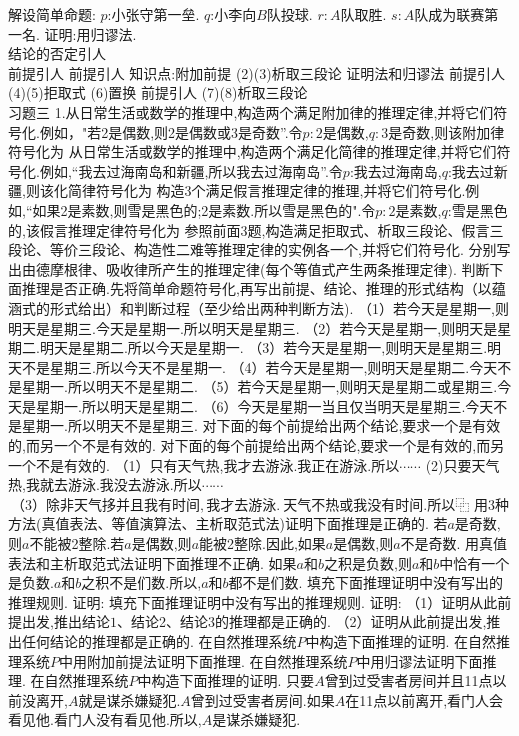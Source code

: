 {解设简单命题:
$p$:小张守第一垒.
$q$:小李向$B$队投球.
$r:A$队取胜.
$s:A$队成为联赛第一名.
证明:用归谬法.\\
结论的否定引人\\
前提引人
前提引人
知识点:附加前提
(2)(3)析取三段论
证明法和归谬法
前提引人
(4)(5)拒取式
(6)置换
前提引人
(7)(8)析取三段论\\
{习题三}
1.从日常生活或数学的推理中,构造两个满足附加律的推理定律,并将它们符号化.例如，"若2是偶数,则2是偶数或3是奇数”.令$p:2$是偶数,$q:3$是奇数,则该附加律符号化为
从日常生活或数学的推理中,构造两个满足化简律的推理定律,并将它们符号化.例如,“我去过海南岛和新疆,所以我去过海南岛”.令$p$:我去过海南岛,$q$:我去过新疆,则该化简律符号化为
构造3个满足假言推理定律的推理,并将它们符号化.例如,“如果2是素数,则雪是黑色的;2是素数.所以雪是黑色的".令$p:2$是素数,$q$:雪是黑色的,该假言推理定律符号化为
参照前面3题,构造满足拒取式、析取三段论、假言三段论、等价三段论、构造性二难等推理定律的实例各一个,并将它们符号化.
分别写出由德摩根律、吸收律所产生的推理定律(每个等值式产生两条推理定律).
判断下面推理是否正确.先将简单命题符号化,再写出前提、结论、推理的形式结构（以蕴涵式的形式给出）和判断过程（至少给出两种判断方法).
（1）若今天是星期一,则明天是星期三.今天是星期一.所以明天是星期三.
（2）若今天是星期一,则明天是星期二.明天是星期二.所以今天是星期一.
（3）若今天是星期一,则明天是星期三.明天不是星期三.所以今天不是星期一.
（4）若今天是星期一,则明天是星期二.今天不是星期一.所以明天不是星期二.
（5）若今天是星期一,则明天是星期二或星期三.今天是星期一.所以明天是星期二.
（6）今天是星期一当且仅当明天是星期三.今天不是星期一.所以明天不是星期三.
对下面的每个前提给出两个结论,要求一个是有效的,而另一个不是有效的.
对下面的每个前提给出两个结论,要求一个是有效的,而另一个不是有效的.
（1）只有天气热,我才去游泳.我正在游泳.所以$\cdots\cdots$
(2)只要天气热,我就去游泳.我没去游泳.所以$\cdots\cdots$
$\mathrm{~（3）除非天气拸并且我有时间,我才去游泳.~天气不热或我没有时间.所以⿻}$
用3种方法(真值表法、等值演算法、主析取范式法)证明下面推理是正确的.
若$a$是奇数,则$a$不能被2整除.若$a$是偶数,则$a$能被2整除.因此,如果$a$是偶数,则$a$不是奇数.
用真值表法和主析取范式法证明下面推理不正确.
如果$a$和$b$之积是负数,则$a$和$b$中恰有一个是负数.$a$和$b$之积不是们数.所以,$a$和$b$都不是们数.
填充下面推理证明中没有写出的推理规则.
证明:
填充下面推理证明中没有写出的推理规则.
证明:
（1）证明从此前提出发,推出结论$1、$结论2、结论3的推理都是正确的.
（2）证明从此前提出发,推出任何结论的推理都是正确的.
在自然推理系统$P$中构造下面推理的证明.
在自然推理系统$P$中用附加前提法证明下面推理.
在自然推理系统$P$中用归谬法证明下面推理.
在自然推理系统$P$中构造下面推理的证明.
只要$A$曾到过受害者房间并且11点以前没离开,$A$就是谋杀嫌疑犯.$A$曾到过受害者房间.如果$A$在11点以前离开,看门人会看见他.看门人没有看见他.所以,$A$是谋杀嫌疑犯.
}

